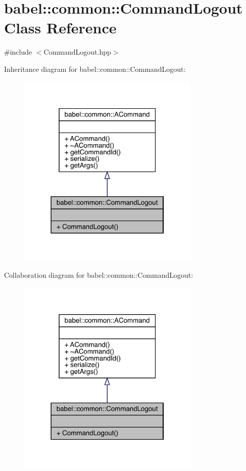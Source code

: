 \hypertarget{classbabel_1_1common_1_1_command_logout}{}\section{babel\+:\+:common\+:\+:Command\+Logout Class Reference}
\label{classbabel_1_1common_1_1_command_logout}


{\ttfamily \#include $<$Command\+Logout.\+hpp$>$}



Inheritance diagram for babel\+:\+:common\+:\+:Command\+Logout\+:\nopagebreak
\begin{figure}[H]
\begin{center}
\leavevmode
\includegraphics[width=247pt]{classbabel_1_1common_1_1_command_logout__inherit__graph}
\end{center}
\end{figure}


Collaboration diagram for babel\+:\+:common\+:\+:Command\+Logout\+:\nopagebreak
\begin{figure}[H]
\begin{center}
\leavevmode
\includegraphics[width=247pt]{classbabel_1_1common_1_1_command_logout__coll__graph}
\end{center}
\end{figure}
